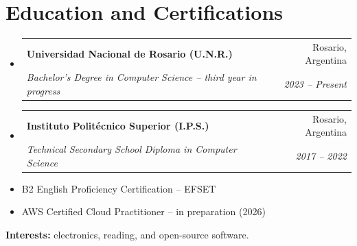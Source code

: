\documentclass[letterpaper,10pt]{article}
\makeatletter
\newcommand{\resumeSubheading}[4]{
    \vspace{0.5mm}\item
    \begin{tabular*}{0.97\textwidth}[t]{l@{\extracolsep{\fill}}r}
        \textbf{#1} & #2 \\
        \textit{#3} & \textit{#4} \\
    \end{tabular*}\vspace{0.5mm}
}
\newcommand{\achievementItem}[1]{
    \item\small{#1}
}
\makeatother
\begin{document}
\section{Education and Certifications}
\begin{itemize}[leftmargin=*]
    \resumeSubheading
    {Universidad Nacional de Rosario (U.N.R.)}{Rosario, Argentina}
    {Bachelor's Degree in Computer Science -- third year in progress}{2023 -- Present}

    \resumeSubheading
    {Instituto Politécnico Superior (I.P.S.)}{Rosario, Argentina}
    {Technical Secondary School Diploma in Computer Science}{2017 -- 2022}

    \achievementItem{B2 English Proficiency Certification -- EFSET}
    \achievementItem{AWS Certified Cloud Practitioner -- in preparation (2026)}
\end{itemize}

\small{\textbf{Interests:} electronics, reading, and open-source software.}
\end{document}
